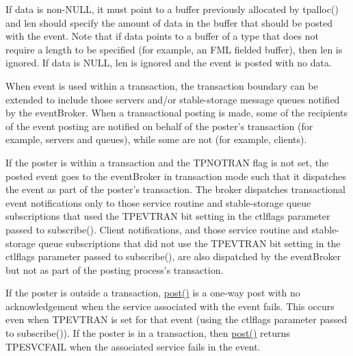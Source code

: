 If data is non-\/\+N\+U\+L\+L, it must point to a buffer previously allocated by tpalloc() and len should specify the amount of data in the buffer that should be posted with the event. Note that if data points to a buffer of a type that does not require a length to be specified (for example, an F\+M\+L fielded buffer), then len is ignored. If data is N\+U\+L\+L, len is ignored and the event is posted with no data.

When event is used within a transaction, the transaction boundary can be extended to include those servers and/or stable-\/storage message queues notified by the event\+Broker. When a transactional posting is made, some of the recipients of the event posting are notified on behalf of the poster’s transaction (for example, servers and queues), while some are not (for example, clients).

If the poster is within a transaction and the T\+P\+N\+O\+T\+R\+A\+N flag is not set, the posted event goes to the event\+Broker in transaction mode such that it dispatches the event as part of the poster’s transaction. The broker dispatches transactional event notifications only to those service routine and stable-\/storage queue subscriptions that used the T\+P\+E\+V\+T\+R\+A\+N bit setting in the ctlflags parameter passed to subscribe(). Client notifications, and those service routine and stable-\/storage queue subscriptions that did not use the T\+P\+E\+V\+T\+R\+A\+N bit setting in the ctlflags parameter passed to subscribe(), are also dispatched by the event\+Broker but not as part of the posting process’s transaction.

If the poster is outside a transaction, \hyperlink{classatmi_1_1event_a0b1f1faae17aa923ce5a4a0d45cfcd07}{post()} is a one-\/way post with no acknowledgement when the service associated with the event fails. This occurs even when T\+P\+E\+V\+T\+R\+A\+N is set for that event (using the ctlflags parameter passed to subscribe()). If the poster is in a transaction, then \hyperlink{classatmi_1_1event_a0b1f1faae17aa923ce5a4a0d45cfcd07}{post()} returns T\+P\+E\+S\+V\+C\+F\+A\+I\+L when the associated service fails in the event. 

